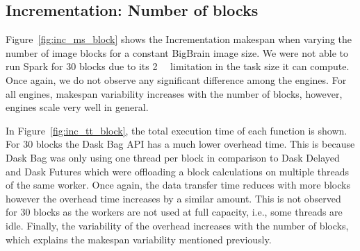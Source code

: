 \documentclass[conference]{IEEEtran}
\begin{document}
\subsection{Incrementation: Number of blocks}

Figure~\ref{fig:inc_ms_block} shows the Incrementation makespan when varying the
number of image blocks for a constant BigBrain image size. We were not able to run
Spark for 30 blocks due to its \SI{2}{\giga\byte} limitation in the task size it can
compute. Once again, we do not observe any significant difference among the engines.
For all engines, makespan variability increases with the number of blocks, however,
engines scale very well in general.


In Figure~\ref{fig:inc_tt_block}, the total execution time of each function is shown.
For 30 blocks the Dask Bag API has a much lower overhead time. This is because Dask
Bag was only using one thread per block in comparison to Dask Delayed and Dask
Futures which were offloading a block calculations on multiple threads of the same
worker. Once again, the data transfer time reduces with more blocks however the
overhead time increases by a similar amount. This is not observed for 30 blocks as
the workers are not used at full capacity, i.e., some threads are idle. Finally, the
variability of the overhead increases with the number of blocks, which explains the
makespan variability mentioned previously.
\end{document}

